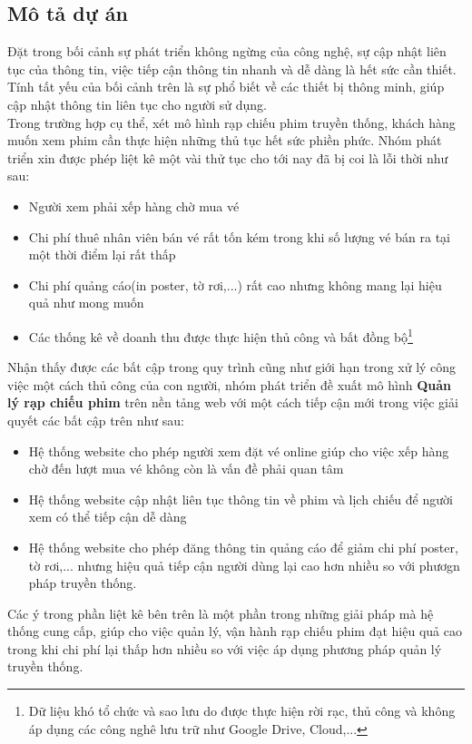 \documentclass[a4paper, 12pt]{article}
\begin{document}
    \subsection{Mô tả dự án}
    Đặt trong bối cảnh sự phát triển không ngừng của công nghệ, sự cập nhật liên tục của thông tin, việc tiếp cận thông tin nhanh và dễ dàng là hết sức cần thiết. Tính tất yếu của bối cảnh trên là sự phổ biết về các thiết bị thông minh, giúp cập nhật thông tin liên tục cho người sử dụng. 
    \\[3mm]
    Trong trường hợp cụ thể, xét mô hình rạp chiếu phim truyền thống, khách hàng muốn xem phim cần thực hiện những thủ tục hết sức phiền phức. Nhóm phát triển xin được phép liệt kê một vài thử tục cho tới nay đã bị coi là lỗi thời như sau:
    \begin{itemize}
        \item Người xem phải xếp hàng chờ mua vé
        \item Chi phí thuê nhân viên bán vé rất tốn kém trong khi số lượng vé bán ra tại một thời điểm lại rất thấp
        \item Chi phí quảng cáo(in poster, tờ rơi,...) rất cao nhưng không mang lại hiệu quả như mong muốn
        \item Các thống kê về doanh thu được thực hiện thủ công và bất đồng bộ\footnote{Dữ liệu khó tổ chức và sao lưu do được thực hiện rời rạc, thủ công và không áp dụng các công nghê lưu trữ như Google Drive, Cloud,...}
    \end{itemize}
    Nhận thấy được các bất cập trong quy trình cũng như giới hạn trong xử lý công việc một cách thủ công của con người, nhóm phát triển đề xuất mô hình \textbf{Quản lý rạp chiếu phim} trên nền tảng web với một cách tiếp cận mới trong việc giải quyết các bất cập trên như sau:
    \begin{itemize}
        \item Hệ thống website cho phép người xem đặt vé online giúp cho việc xếp hàng chờ đến lượt mua vé không còn là vấn đề phải quan tâm
        \item Hệ thống website cập nhật liên tục thông tin về phim và lịch chiếu để người xem có thể tiếp cận dễ dàng
        \item Hệ thống website cho phép đăng thông tin quảng cáo để giảm chi phí poster, tờ rơi,... nhưng hiệu quả tiếp cận người dùng lại cao hơn nhiều so với phươgn pháp truyền thống.
    \end{itemize}
    Các ý trong phần liệt kê bên trên là một phần trong những giải pháp mà hệ thống cung cấp, giúp cho việc quản lý, vận hành rạp chiếu phim đạt hiệu quả cao trong khi chi phí lại thấp hơn nhiều so với việc áp dụng phương pháp quản lý truyền thống.
\end{document}
